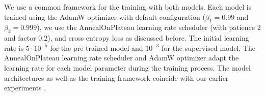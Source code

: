 \documentclass[../../document.tex]{subfiles}
\begin{document}
    We use a common framework for the training with both models.
    Each model is trained using the AdamW optimizer with default configuration ($\beta_1 = 0.99$ and $\beta_2 = 0.999$), we use the AnnealOnPlateau learning rate scheduler (with patience 2 and factor \(0.2\)), and cross entropy loss as discussed before.
    The initial learning rate is \(5\cdot 10^{-5}\) for the pre-trained model and \(10^{-3}\) for the supervised model.
    The AnnealOnPlateau learning rate scheduler and AdamW optimizer adapt the learning rate for each model parameter during the training process.
    The model architectures as well as the training framework coincide with our earlier experiments \citep{RupMoe21,Rup22}.
\end{document}
